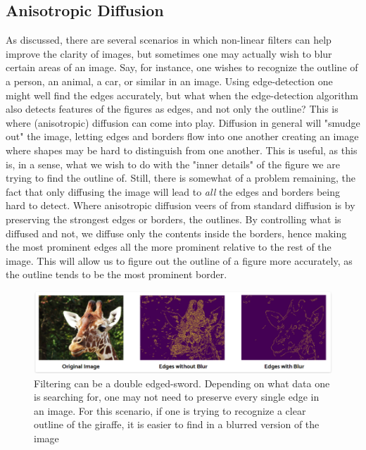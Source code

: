 \documentclass[twoside,a4paper,article]{combine}
\begin{document}
\subsection{Anisotropic Diffusion}
As discussed, there are several scenarios in which non-linear filters can help improve the clarity of images, but sometimes one may actually wish to blur certain areas of an image. Say, for instance, one wishes to recognize the outline of a person, an animal, a car, or similar in an image. Using edge-detection one might well find the edges accurately, but what when the edge-detection algorithm also detects features of the figures as edges, and not only the outline? This is where (anisotropic) diffusion can come into play. Diffusion in general will "smudge out" the image, letting edges and borders flow into one another creating an image where shapes may be hard to distinguish from one another. This is useful, as this is, in a sense, what we wish to do with the "inner details" of the figure we are trying to find the outline of. Still, there is somewhat of a problem remaining, the fact that only diffusing the image will lead to \textit{all} the edges and borders being hard to detect. Where anisotropic diffusion veers of from standard diffusion is by preserving the strongest edges or borders, the outlines. By controlling what is diffused and not, we diffuse only the contents inside the borders, hence making the most prominent edges all the more prominent relative to the rest of the image. This will allow us to figure out the outline of a figure more accurately, as the outline tends to be the most prominent border.
\begin{figure}[H]
    \centering
    \includegraphics[width=1\linewidth]{edgedetection.png}
    \caption{Filtering can be a double edged-sword. Depending on what data one is searching for, one may not need to preserve every single edge in an image. For this scenario, if one is trying to recognize a clear outline of the giraffe, it is easier to find in a blurred version of the image}
    \label{fig:enter-label}
\end{figure}
\end{document}
